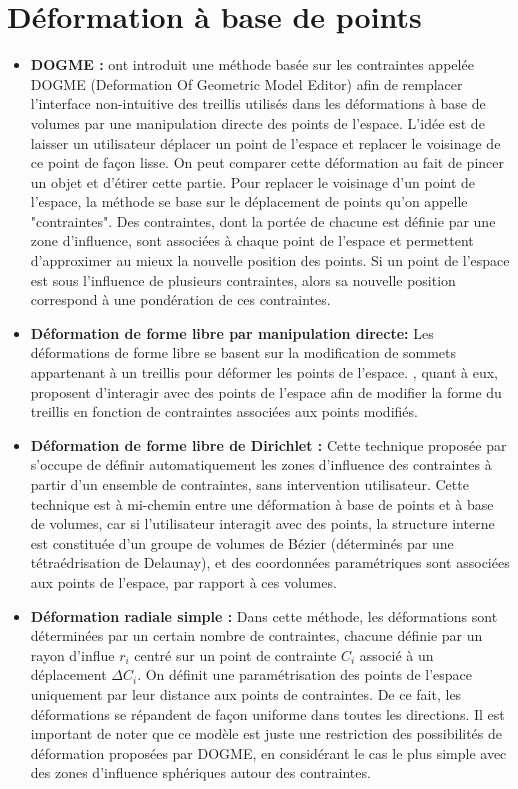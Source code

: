 \section{Déformation à base de points}
\begin{itemize}
\item{\textbf{DOGME :}} \cite{BB91} ont introduit une méthode basée sur
  les contraintes appelée DOGME (Deformation Of Geometric Model
  Editor) afin de remplacer l'interface non-intuitive des treillis
  utilisés dans les déformations à base de volumes par une
  manipulation directe des points de l'espace. L'idée est de laisser
  un utilisateur déplacer un point de l'espace et replacer le
  voisinage de ce point de façon lisse. On peut comparer cette
  déformation au fait de pincer un objet et d'étirer cette
  partie. Pour replacer le voisinage d'un point de l'espace, la
  méthode se base sur le déplacement de points qu'on appelle
  "contraintes". Des contraintes, dont la portée de chacune est
  définie par une zone d'influence, sont associées à chaque point de
  l'espace et permettent d'approximer au mieux la nouvelle position
  des points. Si un point de l'espace est sous l'influence de
  plusieurs contraintes, alors sa nouvelle position correspond à une
  pondération de ces contraintes.
\item{\textbf{Déformation de forme libre par manipulation directe:}}
  Les déformations de forme libre se basent sur la modification de
  sommets appartenant à un treillis pour déformer les points de
  l'espace. \cite{HHK92}, quant à eux, proposent d'interagir avec des
  points de l'espace afin de modifier la forme du treillis en fonction
  de contraintes associées aux points modifiés.
\item{\textbf{Déformation de forme libre de Dirichlet :}} Cette
  technique proposée par \cite{MT97} s'occupe de définir
  automatiquement les zones d'influence des contraintes à partir d'un
  ensemble de contraintes, sans intervention utilisateur. Cette
  technique est à mi-chemin entre une déformation à base de points et
  à base de volumes, car si l'utilisateur interagit avec des points,
  la structure interne est constituée d'un groupe de volumes de Bézier
  (déterminés par une tétraédrisation de Delaunay), et des coordonnées
  paramétriques sont associées aux points de l'espace, par rapport à
  ces volumes.
\item{\textbf{Déformation radiale simple :}} Dans cette méthode, les
  déformations sont déterminées par un certain nombre de contraintes,
  chacune définie par un rayon d'influe $r_i$ centré sur un point de
  contrainte $C_i$ associé à un déplacement $\Delta C_i$. On définit
  une paramétrisation des points de l'espace uniquement par leur
  distance aux points de contraintes. De ce fait, les déformations se
  répandent de façon uniforme dans toutes les directions. Il est
  important de noter que ce modèle est juste une restriction des
  possibilités de déformation proposées par DOGME, en considérant le
  cas le plus simple avec des zones d'influence sphériques autour des
  contraintes.
\end{itemize}


